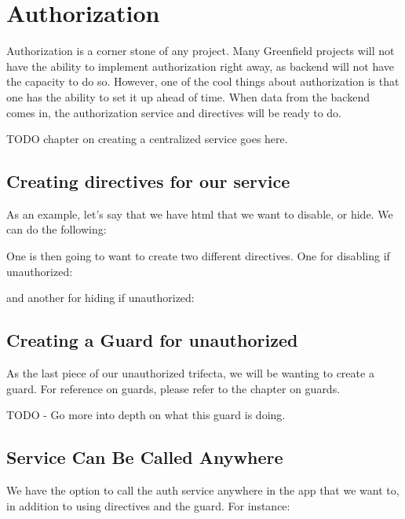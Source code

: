 
\chapter{ Authorization }

Authorization is a corner stone of any project. Many Greenfield projects will
not have the ability to implement authorization right away, as backend will not
have the capacity to do so. However, one of the cool things about authorization
is that one has the ability to set it up ahead of time. When data from the
backend comes in, the authorization service and directives will be ready to do.

TODO chapter on creating a centralized service goes here.

\section{Creating directives for our service}
As an example, let's say that we have html that we want to disable, or hide. We
can do the following:


One is then going to want to create two different directives. One for disabling
if unauthorized:

and another for hiding if unauthorized:


\section{Creating a Guard for unauthorized}
As the last piece of our unauthorized trifecta, we will be wanting to create a
guard. For reference on guards, please refer to the chapter on guards.

TODO - Go more into depth on what this guard is doing.


\section{Service Can Be Called Anywhere}
We have the option to call the auth service anywhere in the app that we want to,
in addition to using directives and the guard. For instance:


